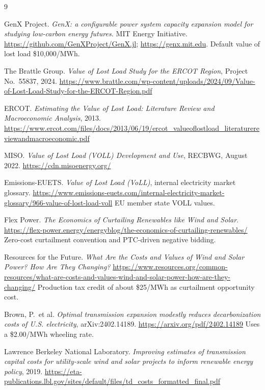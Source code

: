\documentclass[11pt,a4paper]{article}
\begin{document}
\begin{thebibliography}{9}

GenX Project.
\emph{GenX: a configurable power system capacity expansion model for studying
low-carbon energy futures.} MIT Energy Initiative.
\url{https://github.com/GenXProject/GenX.jl};
\url{https://genx.mit.edu}.
Default value of lost load \$10{,}000/MWh.

The Brattle Group.
\emph{Value of Lost Load Study for the ERCOT Region}, Project No.\ 55837, 2024.
\url{https://www.brattle.com/wp-content/uploads/2024/09/Value-of-Lost-Load-Study-for-the-ERCOT-Region.pdf}

ERCOT.
\emph{Estimating the Value of Lost Load: Literature Review and Macroeconomic
Analysis}, 2013.
\url{https://www.ercot.com/files/docs/2013/06/19/ercot_valueoflostload_literaturereviewandmacroeconomic.pdf}

MISO.
\emph{Value of Lost Load (VOLL) Development and Use}, RECBWG, August 2022.
\url{https://cdn.misoenergy.org/}

Emissions-EUETS.
\emph{Value of Lost Load (VoLL)}, internal electricity market glossary.
\url{https://www.emissions-euets.com/internal-electricity-market-glossary/966-value-of-lost-load-voll}
EU member state VOLL values.

Flex Power.
\emph{The Economics of Curtailing Renewables like Wind and Solar}.
\url{https://flex-power.energy/energyblog/the-economics-of-curtailing-renewables/}
Zero-cost curtailment convention and PTC-driven negative bidding.

Resources for the Future.
\emph{What Are the Costs and Values of Wind and Solar Power? How Are They
Changing?}
\url{https://www.resources.org/common-resources/what-are-costs-and-values-wind-and-solar-power-how-are-they-changing/}
Production tax credit of about \$25/MWh as curtailment opportunity cost.

Brown, P.\ et al.
\emph{Optimal transmission expansion modestly reduces decarbonization costs of
U.S. electricity}, arXiv:2402.14189.
\url{https://arxiv.org/pdf/2402.14189}
Uses a \$2.00/MWh wheeling rate.

Lawrence Berkeley National Laboratory.
\emph{Improving estimates of transmission capital costs for utility-scale wind
and solar projects to inform renewable energy policy}, 2019.
\url{https://eta-publications.lbl.gov/sites/default/files/td_costs_formatted_final.pdf}

\end{thebibliography}
\end{document}
